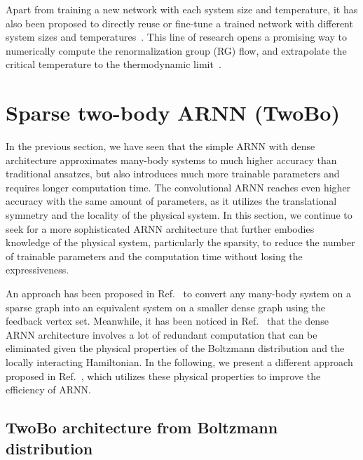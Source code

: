 Apart from training a new network with each system size and temperature, it has also been proposed to directly reuse or fine-tune a trained network with different system sizes and temperatures~\cite{efthymiou2019super, mills2019extensive, rende2024fine}. This line of research opens a promising way to numerically compute the renormalization group (RG) flow, and extrapolate the critical temperature to the thermodynamic limit~\cite{ron2002inverse}.

\section{Sparse two-body ARNN (TwoBo)}
\label{sec:twobo}

In the previous section, we have seen that the simple ARNN with dense architecture approximates many-body systems to much higher accuracy than traditional ansatzes, but also introduces much more trainable parameters and requires longer computation time. The convolutional ARNN reaches even higher accuracy with the same amount of parameters, as it utilizes the translational symmetry and the locality of the physical system. In this section, we continue to seek for a more sophisticated ARNN architecture that further embodies knowledge of the physical system, particularly the sparsity, to reduce the number of trainable parameters and the computation time without losing the expressiveness.

An approach has been proposed in Ref.~\cite{pan2021solving} to convert any many-body system on a sparse graph into an equivalent system on a smaller dense graph using the feedback vertex set. Meanwhile, it has been noticed in Ref.~\cite{pr2021analysis} that the dense ARNN architecture involves a lot of redundant computation that can be eliminated given the physical properties of the Boltzmann distribution and the locally interacting Hamiltonian. In the following, we present a different approach proposed in Ref.~\cite{biazzo2024sparse}, which utilizes these physical properties to improve the efficiency of ARNN.

\subsection{TwoBo architecture from Boltzmann distribution}

